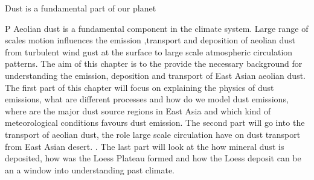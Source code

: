 Dust is a fundamental part of our planet  

P Aeolian dust is a fundamental component in the climate system. Large range of scales motion influences the emission 
,transport and deposition of aeolian dust from turbulent wind gust at the surface to large scale atmospheric circulation 
patterns. The aim of this chapter is to the provide the necessary background for understanding the emission, deposition 
and transport of East Asian aeolian dust. The first part of this chapter will focus on explaining the physics of dust 
emissions, what are different processes and how do we model dust emissions, where are the major dust source regions in 
East Asia and which kind of meteorological conditions favours dust emission. The second part will go into the transport 
of aeolian dust, the role large scale circulation have on dust transport from East Asian desert. . The last part will look at the how mineral dust is deposited, how was the 
Loess Plateau formed and how the Loess deposit can be an a window into understanding past climate.